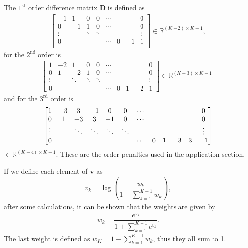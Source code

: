 \documentclass[aps,reprint,amsmath,amssymb,showpacs,showkeys]{revtex4-1}%
\begin{document}
The $1^{\text{st}}$ order difference matrix \textbf{D} is defined as
\begin{align*}
\begin{bmatrix}
-1 & 1   & 0  & 0 & \cdots & & & 0 \\
0  &  -1 & 1  & 0 & \cdots & & & 0 \\
\vdots  &    & \ddots & \ddots   & &&& \vdots \\   
0 &    &    &   & \cdots & 0 &  -1 & 1 \\
\end{bmatrix}
\in \mathbb{R}^{(K-2)\times K-1},
\end{align*}
for the $2^{\text{nd}}$ order is
\begin{align*}
\begin{bmatrix}
1 & -2 &  1 & 0 & 0 & \cdots & & & & 0 \\
0 & 1  & -2 & 1 & 0 & \cdots & & & & 0 \\
\vdots & & \ddots & \ddots & \ddots &&&&& \vdots \\
0 & &&&& \cdots & 0 & 1 & -2 & 1 
\end{bmatrix}
\in \mathbb{R}^{(K-3)\times K-1},
\end{align*}
and for the $3^{\text{rd}}$ order is
\begin{align*}
\setcounter{MaxMatrixCols}{12} %
\begin{bmatrix}
1 & -3 &  3 & -1 &  0 & 0 & \cdots & & & & & 0 \\
0 &  1 & -3 &  3 & -1 & 0 & \cdots & & & & & 0 \\
\vdots &    & \ddots &  \ddots & \ddots & \ddots & &  & & & & \vdots \\
0 &   &  &   &  &  & \cdots & 0 & 1 & -3 & 3 & -1  
\end{bmatrix}
\end{align*}
$\in \mathbb{R}^{(K-4)\times K-1}$.  These are the order penalties used in the application section.

If we define each element of $\bm{v}$ as
\begin{align*}
v_k = \log \left( \dfrac{w_k}{1-\sum_{k=1}^{K-1}w_k} \right),
\end{align*}
after some calculations, it can be shown that the weights are given by
\begin{align*}
w_k = \dfrac{e^{v_k}}{1+ \sum^{K-1}_{k=1}e^{v_k}}.
\end{align*}
The last weight is defined as $w_K = 1 - \sum_{k=1}^{K-1}w_k$, thus they all sum to 1.
\end{document}
